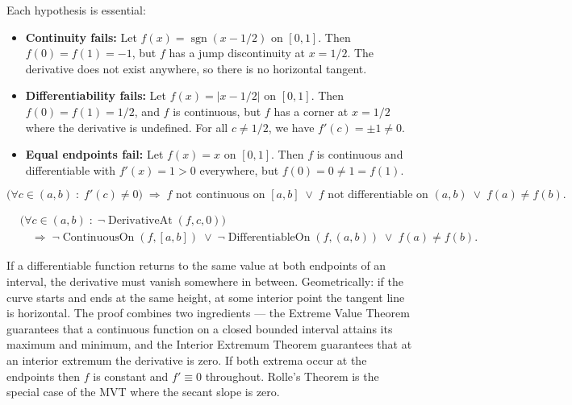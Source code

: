 \begin{remark*}
Each hypothesis is essential:
\begin{itemize}
  \item \textbf{Continuity fails:} Let $f(x) = \operatorname{sgn}(x - 1/2)$ on $[0,1]$. Then $f(0) = f(1) = -1$, but $f$ has a jump discontinuity at $x = 1/2$. The derivative does not exist anywhere, so there is no horizontal tangent.
  \item \textbf{Differentiability fails:} Let $f(x) = |x - 1/2|$ on $[0,1]$. Then $f(0) = f(1) = 1/2$, and $f$ is continuous, but $f$ has a corner at $x = 1/2$ where the derivative is undefined. For all $c \ne 1/2$, we have $f'(c) = \pm 1 \ne 0$.
  \item \textbf{Equal endpoints fail:} Let $f(x) = x$ on $[0,1]$. Then $f$ is continuous and differentiable with $f'(x) = 1 > 0$ everywhere, but $f(0) = 0 \ne 1 = f(1)$.
\end{itemize}
\end{remark*}

\begin{remark*}
\[
\bigl(\forall c \in (a,b)\;:\; f'(c) \ne 0\bigr)
\;\Rightarrow\;
f \text{ not continuous on } [a,b]
\;\lor\;
f \text{ not differentiable on } (a,b)
\;\lor\;
f(a) \ne f(b).
\]
\end{remark*}

\begin{remark*}
\begin{align*}
&\bigl(\forall c\in(a,b)\;:\;\neg\operatorname{DerivativeAt}(f,c,0)\bigr)\\
&\quad\Longrightarrow\;
\neg\operatorname{ContinuousOn}(f,[a,b])
\;\lor\;
\neg\operatorname{DifferentiableOn}(f,(a,b))
\;\lor\;
f(a)\ne f(b).
\end{align*}
\end{remark*}

\begin{remark*}[Interpretation]
If a differentiable function returns to the same value at both endpoints of an interval, the derivative must vanish somewhere in between. Geometrically: if the curve starts and ends at the same height, at some interior point the tangent line is horizontal. The proof combines two ingredients --- the Extreme Value Theorem guarantees that a continuous function on a closed bounded interval attains its maximum and minimum, and the Interior Extremum Theorem guarantees that at an interior extremum the derivative is zero. If both extrema occur at the endpoints then $f$ is constant and $f' \equiv 0$ throughout. Rolle's Theorem is the special case of the MVT where the secant slope is zero.
\end{remark*}

